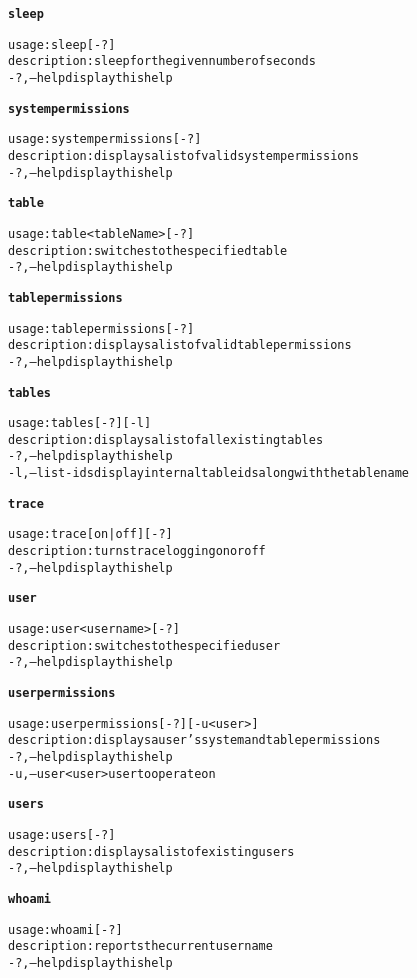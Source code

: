 \begin{alltt}
\textbf{sleep}

    usage: sleep [-?]
    description: sleep for the given number of seconds
      -?,--help  display this help

\textbf{systempermissions}

    usage: systempermissions [-?]
    description: displays a list of valid system permissions
      -?,--help  display this help

\textbf{table}

    usage: table <tableName> [-?]
    description: switches to the specified table
      -?,--help  display this help

\textbf{tablepermissions}

    usage: tablepermissions [-?]
    description: displays a list of valid table permissions
      -?,--help  display this help

\textbf{tables}

    usage: tables [-?] [-l]
    description: displays a list of all existing tables
      -?,--help  display this help
      -l,--list-ids  display internal table ids along with the table name

\textbf{trace}

    usage: trace [ on | off ] [-?]
    description: turns trace logging on or off
      -?,--help  display this help

\textbf{user}

    usage: user <username> [-?]
    description: switches to the specified user
      -?,--help  display this help

\textbf{userpermissions}

    usage: userpermissions [-?] [-u <user>]
    description: displays a user's system and table permissions
      -?,--help  display this help
      -u,--user <user>  user to operate on

\textbf{users}

    usage: users [-?]
    description: displays a list of existing users
      -?,--help  display this help

\textbf{whoami}

    usage: whoami [-?]
    description: reports the current user name
      -?,--help  display this help

\end{alltt}
